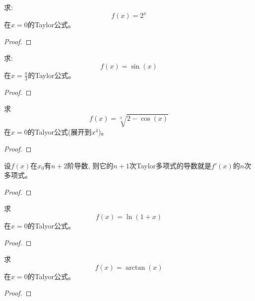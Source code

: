 \begin{example}
    求:
    \begin{equation*}
        f(x) = 2^x
    \end{equation*}
    在$x = 0$的Taylor公式。
\end{example}
\begin{proof}
    
\end{proof}

\begin{example}
    求:
    \begin{equation*}
        f(x) = \sin(x)
    \end{equation*}
    在$x = \frac{\pi}{3}$的Taylor公式。
\end{example}
\begin{proof}
    
\end{proof}

\begin{example}
    求
    \begin{equation*}
        f(x) = \sqrt[3]{2-\cos(x)}
    \end{equation*}
    在$x = 0$的Talyor公式(展开到$x^4$)。
\end{example}
\begin{proof}
    
\end{proof}

\begin{theorem}
    设$f(x)$在$x_0$有$n+2$阶导数, 则它的$n+1$次Taylor多项式的导数就是$f'(x)$的$n$次多项式。
\end{theorem}
\begin{proof}
    
\end{proof}
\begin{example}
    求
    \begin{equation*}
        f(x) = \ln(1+x)
    \end{equation*}
    在$x = 0$的Talyor公式。    
\end{example}
\begin{proof}
    
\end{proof}


\begin{example}
    求
    \begin{equation*}
        f(x) = \arctan(x)
    \end{equation*}
    在$x = 0$的Talyor公式。    
\end{example}
\begin{proof}
    
\end{proof}

